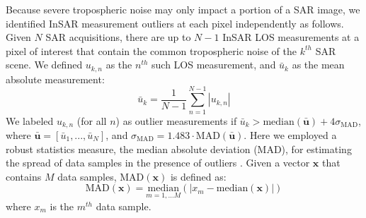 Because severe tropospheric noise may only impact a portion of a SAR image, we identified InSAR measurement outliers at each pixel independently as follows. Given $N$ SAR acquisitions, there are up to $N-1$ InSAR LOS measurements at a pixel of interest that contain the common tropospheric noise of the $k^{th}$ SAR scene. We defined $u_{k,n}$ as the $n^{th}$ such LOS measurement, and $\bar{u}_k$ as the mean absolute measurement:
\begin{equation}
	\bar{u}_k  = \frac{1}{N-1} \sum_{n=1}^{N-1} |u_{k,n}|  
\end{equation}
We labeled $u_{k,n}$ (for all $n$) as outlier measurements if $\bar{u}_k > \mathrm{median}(\mathbf{\bar{u}}) + 4 \sigma_{\mathrm{MAD}}$, where $\mathbf{\bar{u}}=[\bar{u}_1,...,\bar{u}_N]$, and $\sigma_{\mathrm{MAD}}=1.483 \cdot \mathrm{MAD}(\mathbf{\bar{u}})$. Here we employed a robust statistics measure, the median absolute deviation (MAD), for estimating the spread of data samples in the presence of outliers \citep{Hampel1974InfluenceCurveIts, Rousseeuw2011RobustStatisticsOutlier}. Given a vector $\mathbf{x}$ that contains $M$ data samples, $\mathrm{MAD}(\mathbf{x})$ is defined as:
\begin{equation}
	\mathrm{MAD}(\mathbf{x}) =  \underset{m = 1,\ldots M}{\mathrm{median}} \left( \bigr\lvert  x_m - \mathrm{median}(\mathbf{x})  \bigr\rvert \right)
\end{equation}
where $x_m$ is the $m^{th}$ data sample. 









